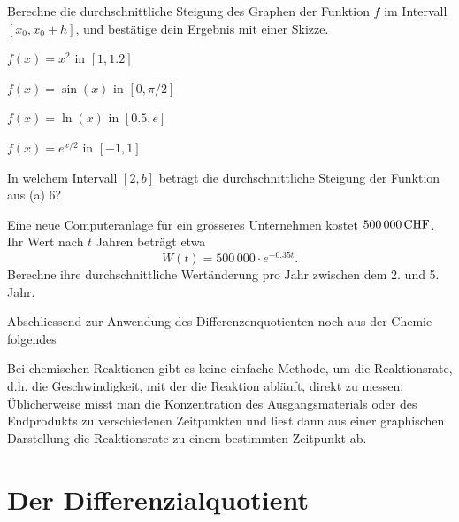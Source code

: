 \documentclass[%
11pt,%
twoside,%
titlepage,%
german,%
headsepline%
]{scrartcl}
\begin{document}
\begin{ueb}[Differenzenquotient]\label{uebdifferenzenquotient}
Berechne die durchschnittliche Steigung des Graphen der Funktion $f$ im Intervall $[x_0,x_0+h]$, und best\"atige dein Ergebnis mit einer Skizze.
\begin{enumeratea}
\item $f(x)=x^2$ in $[1,1.2]$
\item $f(x)=\sin(x)$ in $[0,\pi/2]$
\item $f(x)=\ln(x)$ in $[0.5,e]$
\item $f(x)=e^{x/2}$ in $[-1,1]$
\item In welchem Intervall $[2,b]$ betr\"agt die durchschnittliche Steigung der Funktion aus (a) $6$?
\end{enumeratea}
\end{ueb}

\begin{ueb}[Computer]\label{uebcomputer}
Eine neue Computeranlage f\"ur ein gr\"osseres Unternehmen kostet $\unit[500\,000]{CHF}$. Ihr Wert nach $t$ Jahren betr\"agt etwa
$$W(t)=500\,000\cdot e^{-0.35t}.$$
Berechne ihre durchschnittliche Wert\"anderung pro Jahr zwischen dem 2. und 5. Jahr.
\end{ueb}

Abschliessend zur Anwendung des Differenzenquotienten noch aus der Chemie folgendes
\begin{bsp}
Bei chemischen Reaktionen gibt es keine einfache Methode, um die Reaktionsrate, d.h. die Geschwindigkeit, mit der die Reaktion abl\"auft, direkt zu messen. \"Ublicherweise misst man die Konzentration des Ausgangsmaterials oder des Endprodukts zu verschiedenen Zeitpunkten und liest dann aus einer graphischen Darstellung die Reaktionsrate zu einem bestimmten Zeitpunkt ab.
\end{bsp}

\section{Der Differenzialquotient}
\end{document}
